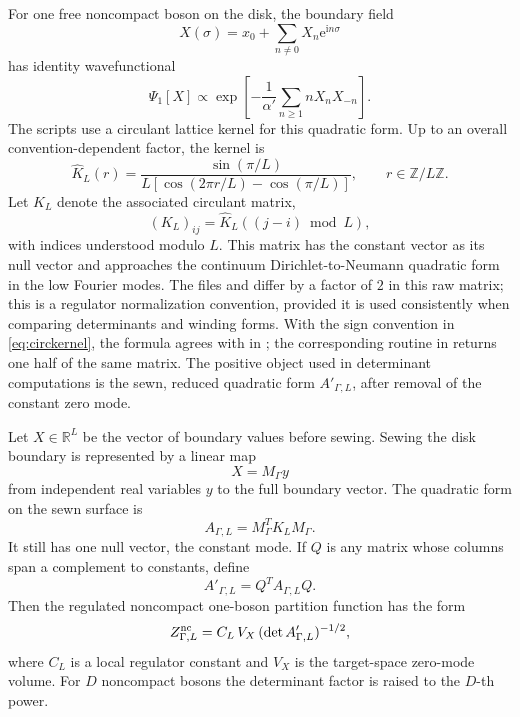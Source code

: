 \documentclass[11pt]{article}
\numberwithin{equation}{section}
\newcommand{\A}{\alpha'}
\newcommand{\bR}{\mathbb R}
\newcommand{\bZ}{\mathbb Z}
\newcommand{\ee}{\mathrm e}
\newcommand{\ii}{\mathrm i}
\newcommand{\wh}{\widehat}
\begin{document}
For one free noncompact boson on the disk, the boundary field
\[
        X(\sigma)=x_0+\sum_{n\neq0}X_n\ee^{\ii n\sigma}
\]
has identity wavefunctional
\begin{equation}
        \Psi_1[X]
        \propto
        \exp\left[-\frac{1}{\A}\sum_{n\geq1}n X_nX_{-n}\right].
        \label{eq:identitywf}
\end{equation}
The scripts use a circulant lattice kernel for this quadratic form.  Up to an
overall convention-dependent factor, the kernel is
\begin{equation}
        \wh K_L(r)
        =
        \frac{\sin(\pi/L)}
        {L\left[\cos(2\pi r/L)-\cos(\pi/L)\right]},
        \qquad r\in\bZ/L\bZ.
        \label{eq:circkernel}
\end{equation}
Let \(K_L\) denote the associated circulant matrix,
\begin{equation}
        (K_L)_{ij}=\wh K_L((j-i)\bmod L),
        \label{eq:circmatrix}
\end{equation}
with indices understood modulo \(L\).  This matrix has the constant vector as
its null vector and approaches the continuum Dirichlet-to-Neumann quadratic form
in the low Fourier modes.  The files  and
 differ by a factor of \(2\) in this raw matrix;
this is a regulator normalization convention, provided it is used consistently
when comparing determinants and winding forms.
With the sign convention in \eqref{eq:circkernel}, the formula agrees with
 in ; the corresponding
routine in  returns one half of the same matrix.
The positive object used in determinant computations is the sewn, reduced
quadratic form \(A'_{\Gamma,L}\), after removal of the constant zero mode.

Let \(X\in\bR^L\) be the vector of boundary values before sewing.  Sewing the
disk boundary is represented by a linear map
\[
        X=M_{\Gamma}y
\]
from independent real variables \(y\) to the full boundary vector.  The
quadratic form on the sewn surface is
\begin{equation}
        A_{\Gamma,L}=M_{\Gamma}^{T}K_LM_{\Gamma}.
        \label{eq:sewnmattermatrix}
\end{equation}
It still has one null vector, the constant mode.  If \(Q\) is any matrix whose
columns span a complement to constants, define
\begin{equation}
        A'_{\Gamma,L}=Q^{T}A_{\Gamma,L}Q.
\end{equation}
Then the regulated noncompact one-boson partition function has the form
\begin{equation}
        Z^{\rm nc}_{\Gamma,L}
        =
        C_L\,V_X\,(\det A'_{\Gamma,L})^{-1/2},
        \label{eq:noncompactdet}
\end{equation}
where \(C_L\) is a local regulator constant and \(V_X\) is the target-space
zero-mode volume.  For \(D\) noncompact bosons the determinant factor is
raised to the \(D\)-th power.
\end{document}

